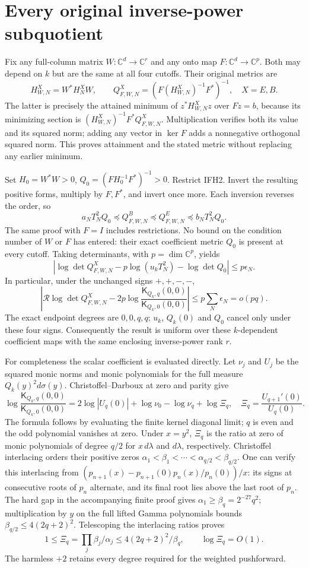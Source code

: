 \documentclass[11pt]{article}
\begin{document}
\section{Every original inverse-power subquotient}
Fix any full-column matrix $W:\mathbb C^d\to\mathbb C^r$ and any
onto map $F:\mathbb C^d\to\mathbb C^p$. Both may depend on $k$ but
are the same at all four cutoffs. Their original metrics are
\[
H^X_{W,N}=W^*H^X_NW,\qquad
Q^X_{F,W,N}=(F(H^X_{W,N})^{-1}F^*)^{-1},\quad X=E,B.
\tag{IFH4}
\]
The latter is precisely the attained minimum of $z^*H^X_{W,N}z$
over $Fz=b$, because its minimizing section is
$(H^X_{W,N})^{-1}F^*Q^X_{F,W,N}$. Multiplication verifies both its
value and its squared norm; adding any vector in $\ker F$ adds
a nonnegative orthogonal squared norm. This proves attainment and
the stated metric without replacing any earlier minimum.

Set $H_0=W^*W>0$, $Q_0=(FH_0^{-1}F^*)^{-1}>0$.
Restrict IFH2. Invert the resulting positive forms, multiply by
$F,F^*$, and invert once more. Each inversion reverses the order,
so
\[
a_NT_N^2Q_0\preceq Q^B_{F,W,N}
 \preceq Q^E_{F,W,N}\preceq b_NT_N^2Q_0 .
\tag{IFH5}
\]
The same proof with $F=I$ includes restrictions.
No bound on the condition number of $W$ or $F$ has entered:
their exact coefficient metric $Q_0$ is present at every cutoff.
Taking determinants, with $p=\dim\mathbb C^p$, yields
\[
\left|
\log\det Q^X_{F,W,N}
-p\log(u_kT_N^2)-\log\det Q_0
\right|\le p\epsilon_N .
\tag{IFH6}
\]
In particular, under the unchanged signs $+,+,-,-$,
\[
\left|
\mathcal R\log\det Q^X_{F,W,N}
-2p\log\frac{\mathsf K_{Q_k,q}(0,0)}
                    {\mathsf K_{Q_k,0}(0,0)}
\right|
\le p\sum_N\epsilon_N=o(pq).
\tag{IFH7}
\]
The exact endpoint degrees are $0,0,q,q$; $u_k$, $Q_k(0)$ and
$Q_0$ cancel only under these four signs.
Consequently the result is uniform over these $k$-dependent
coefficient maps with the same enclosing inverse-power rank $r$.

For completeness the scalar coefficient is evaluated directly.
Let $\nu_j$ and $U_j$ be the squared monic norms and monic polynomials
for the full measure $Q_k(y)^2d\sigma(y)$.
Christoffel--Darboux at zero and parity give
\[
\log\frac{\mathsf K_{Q_k,q}(0,0)}
              {\mathsf K_{Q_k,0}(0,0)}
=2\log|U_q(0)|+\log\nu_0-\log\nu_q+\log\Xi_q,
\quad
\Xi_q=\frac{U_{q+1}'(0)}{U_q(0)}.
\tag{IFH8}
\]
The formula follows by evaluating the finite kernel diagonal limit;
$q$ is even and the odd polynomial vanishes at zero.
Under $x=y^2$, $\Xi_q$ is the ratio at zero of monic polynomials
of degree $q/2$ for $x\,d\lambda$ and $d\lambda$, respectively.
Christoffel interlacing orders their positive zeros
$\alpha_1<\beta_1<\cdots<\alpha_{q/2}<\beta_{q/2}$.
One can verify this interlacing from
$(p_{n+1}(x)-p_{n+1}(0)p_n(x)/p_n(0))/x$:
its signs at consecutive roots of $p_n$ alternate, and its final
root lies above the last root of $p_n$.
The hard gap in the accompanying finite proof gives
$\alpha_1\ge\beta_q=2^{-27}q^2$; multiplication by $y$
on the full lifted Gamma polynomials bounds
$\beta_{q/2}\le4(2q+2)^2$.
Telescoping the interlacing ratios proves
\[
1\le\Xi_q=\prod_j\beta_j/\alpha_j
\le4(2q+2)^2/\beta_q,\qquad \log\Xi_q=O(1).
\tag{IFH9}
\]
The harmless $+2$ retains every degree required for the weighted
pushforward.
\end{document}
